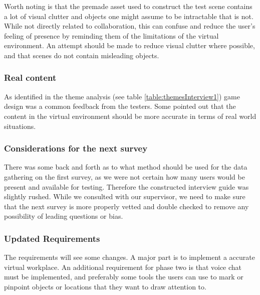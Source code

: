 Worth noting is that the premade asset used to construct the test scene contains a lot of visual clutter and objects one might assume to be intractable that is not. While not directly related to collaboration, this can confuse and reduce the user's feeling of presence by reminding them of the limitations of the virtual environment. An attempt should be made to reduce visual clutter where possible, and that scenes do not contain misleading objects.

\subsubsection{Real content}
As identified in the theme analysis (see table \ref{table:themesInterview1}) game design was a common feedback from the testers. Some pointed out that the content in the virtual environment should be more accurate in terms of real world situations.      

\subsubsection{Considerations for the next survey}
There was some back and forth as to what method should be used for the data gathering on the first survey, as we were not certain how many users would be present and available for testing. Therefore the constructed interview guide was slightly rushed. While we consulted with our supervisor, we need to make sure that the next survey is more properly vetted and double checked to remove any possibility of leading questions or bias. 

\subsubsection{Updated Requirements}
The requirements will see some changes. A major part is to implement a accurate virtual workplace.  An additional requirement for phase two is that voice chat must be implemented, and preferably some tools the users can use to mark or pinpoint objects or locations that they want to draw attention to.



\cleardoublepage